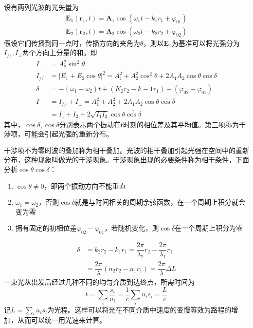 设有两列光波的光矢量为
\begin{align}
    \bm{E}_1(\bm{r}_1,t)=\bm{A}_1\cos (\omega_1 t -k_1 r_1 + \varphi _{01})\\
    \bm{E}_2(\bm{r}_2,t)=\bm{A}_2\cos (\omega_2 t -k_2 r_2 + \varphi _{02})
\end{align}
假设它们传播到同一点时，传播方向的夹角为$\theta$，则以$\bm{E}_1$为基准可以将光强分为$I_{//},I_{\perp}$两个方向上分量的和。即
\begin{align}
    I_{\perp}&=A^2_2 \sin^2 \theta\\
    I_{//}&=|E_1+E_2\cos \theta|^2=A_1^2+A_2^2\cos ^2 \theta +2A_1A_2\cos \theta \cos \delta\\
    \delta &=-(\omega_1 -\omega _2)t+(K_2r_2-k-1r_1)-(\varphi_{02}-\varphi_{01})\\
    I&=I_{//}+I_{\perp}=A_1^2+A_2^2+2A_1A_2\cos \theta \overline{\cos \delta}\\
    &=I_1+I_2+2\sqrt{I_1I_2}\cos \theta \overline{\cos \delta}
\end{align}
其中，$\cos \delta,\overline{\cos \delta}$分别表示两个振动在t时刻的相位差及其平均值。第三项称为干涉项，可能会引起光强的重新分布。

干涉项不为零时波的叠加称为相干叠加。光波的相干叠加引起光强在空间中的重新分布，这种现象叫做光的干涉现象。干涉现象出现的必要条件称为相干条件，下面分析$\cos \theta \overline{\cos \delta}$：
\begin{enumerate}
    \item $\cos \theta\neq 0$，即两个振动方向不能垂直
    \item $\omega_1 = \omega_2$，否则$\cos \delta$就是与时间相关的周期余弦函数，在一个周期上积分就会变为零
    \item 拥有固定的初相位差$\varphi_{02}-\varphi_{01}$，若随机变化，则$\cos \delta$在一个周期上积分为零
\end{enumerate}
{\color{red}{本章后的基本假设：两束光的频率和初相位都相等，即}}
\begin{align}
    \delta&=k_2r_2-k_1r_1=\dfrac{2 \pi }{\lambda_2}r_2-\dfrac{2 \pi }{\lambda_1}r_1\\
    &=\dfrac{2 \pi }{\lambda}(n_2r_2-n_1r_1)=\dfrac{2 \pi}{\lambda}\Delta L
\end{align}
一束光从出发后经过几种不同的均匀介质到达终点，所需时间为
\begin{equation}
    t=\sum_i \dfrac{s_i}{u_i}=\dfrac{1}{c}\sum_i n_i s_i =\dfrac{L}{c}
\end{equation}
记$L=\sum_i n_i s_i$为光程。这样可以将光在不同介质中速度的变慢等效为路程的增加，从而可以统一用光速来计算。

